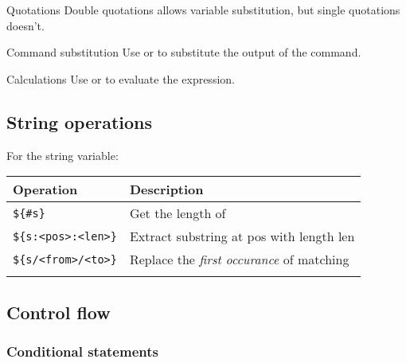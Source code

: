 \documentclass{article}
\begin{document}
\begin{knBox}
    {Quotations}
    Double quotations allows variable substitution, but single quotations doesn't.
    
\end{knBox}

\begin{knBox}
    {Command substitution}
    Use  or  to substitute the output of the command.
\end{knBox}

\begin{knBox}
    {Calculations}
    Use  or  to evaluate the expression.
\end{knBox}

\subsection{String operations}
For the  string variable:
\begin{table}[H]
    \begin{tabular}{ll}
        \textbf{Operation}           & \textbf{Description}                                        \\ \hline
        \lstinline|${#s}|            & Get the length of  \\ \hline
        \lstinline|${s:<pos>:<len>}| & Extract substring at pos with length len                    \\ \hline
        \lstinline|${s/<from>/<to>}| & Replace the \emph{first occurance} of matching              \\ \hline
    \end{tabular}
\end{table}

\subsection{Control flow}

\subsubsection{Conditional statements}

\end{document}
